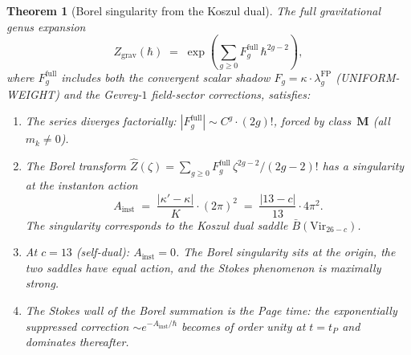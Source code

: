 \documentclass[11pt,reqno]{amsart}
\newtheorem{theorem}{Theorem}[section]
\theoremstyle{definition}
\theoremstyle{remark}
\providecommand{\barB}{\bar{B}}
\begin{document}
\begin{theorem}[Borel singularity from the Koszul dual]
\label{thm:page-borel}
The full gravitational genus expansion
\begin{equation}\label{eq:genus-borel}
Z_{\mathrm{grav}}(\hbar)
\;=\;
\exp\!\left(
 \sum_{g \ge 0} F_g^{\mathrm{full}}\,\hbar^{2g-2}
\right)\!,
\end{equation}
where $F_g^{\mathrm{full}}$ includes both the convergent scalar
shadow $F_g = \kappa \cdot \lambda_g^{\mathrm{FP}}$
(UNIFORM-WEIGHT) and the Gevrey-$1$ field-sector corrections,
satisfies:
\begin{enumerate}[label=\textup{(\roman*)}]
\item The series diverges factorially:
  $|F_g^{\mathrm{full}}| \sim C^g \cdot (2g)!$,
  forced by class~$\mathbf{M}$ (all $m_k \ne 0$).
\item The Borel transform
  $\hat{Z}(\zeta) = \sum_{g \ge 0}
  F_g^{\mathrm{full}}\,\zeta^{2g-2}/(2g{-}2)!$ has a
  singularity at the instanton action
  \begin{equation}\label{eq:instanton-action}
  A_{\mathrm{inst}}
  \;=\;
  \frac{|\kappa' - \kappa|}{K}
  \cdot(2\pi)^2
  \;=\;
  \frac{|13 - c|}{13}\cdot 4\pi^2.
  \end{equation}
  The singularity corresponds to the Koszul dual saddle
  $\barB(\mathrm{Vir}_{26-c})$.
\item At $c = 13$ (self-dual): $A_{\mathrm{inst}} = 0$.
  The Borel singularity sits at the origin, the two saddles
  have equal action, and the Stokes phenomenon is maximally
  strong.
\item The Stokes wall of the Borel summation is the Page time:
  the exponentially suppressed correction
  $\sim e^{-A_{\mathrm{inst}}/\hbar}$
  becomes of order unity at $t = t_P$ and
  dominates thereafter.
\end{enumerate}
\end{theorem}
\end{document}
